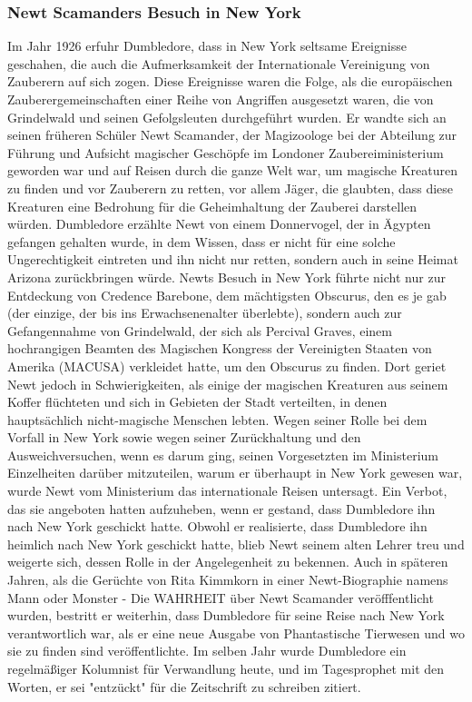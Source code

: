 \documentclass[a4paper, 10pt]{article}
\begin{document}
\subsubsection*{Newt Scamanders Besuch in New York}
Im Jahr 1926 erfuhr Dumbledore, dass in New York seltsame Ereignisse geschahen, die auch die Aufmerksamkeit der Internationale Vereinigung von Zauberern auf sich zogen. Diese Ereignisse waren die Folge, als die europäischen Zauberergemeinschaften einer Reihe von Angriffen ausgesetzt waren, die von Grindelwald und seinen Gefolgsleuten durchgeführt wurden.
\vspace{10pt}
\newline
{}  
Er wandte sich an seinen früheren Schüler Newt Scamander, der Magizoologe bei der Abteilung zur Führung und Aufsicht magischer Geschöpfe im Londoner Zaubereiministerium geworden war und auf Reisen durch die ganze Welt war, um magische Kreaturen zu finden und vor Zauberern zu retten, vor allem Jäger, die glaubten, dass diese Kreaturen eine Bedrohung für die Geheimhaltung der Zauberei darstellen würden. Dumbledore erzählte Newt von einem Donnervogel, der in Ägypten gefangen gehalten wurde, in dem Wissen, dass er nicht für eine solche Ungerechtigkeit eintreten und ihn nicht nur retten, sondern auch in seine Heimat Arizona zurückbringen würde. Newts Besuch in New York führte nicht nur zur Entdeckung von Credence Barebone, dem mächtigsten Obscurus, den es je gab (der einzige, der bis ins Erwachsenenalter überlebte), sondern auch zur Gefangennahme von Grindelwald, der sich als Percival Graves, einem hochrangigen Beamten des Magischen Kongress der Vereinigten Staaten von Amerika (MACUSA) verkleidet hatte, um den Obscurus zu finden. Dort geriet Newt jedoch in Schwierigkeiten, als einige der magischen Kreaturen aus seinem Koffer flüchteten und sich in Gebieten der Stadt verteilten, in denen hauptsächlich nicht-magische Menschen lebten.
\vspace{10pt}
\newline
{}  
Wegen seiner Rolle bei dem Vorfall in New York sowie wegen seiner Zurückhaltung und den Ausweichversuchen, wenn es darum ging, seinen Vorgesetzten im Ministerium Einzelheiten darüber mitzuteilen, warum er überhaupt in New York gewesen war, wurde Newt vom Ministerium das internationale Reisen untersagt. Ein Verbot, das sie angeboten hatten aufzuheben, wenn er gestand, dass Dumbledore ihn nach New York geschickt hatte. Obwohl er realisierte, dass Dumbledore ihn heimlich nach
New York geschickt hatte, blieb Newt seinem alten Lehrer treu und weigerte sich, dessen Rolle in der Angelegenheit zu bekennen. Auch in späteren Jahren, als die Gerüchte von Rita Kimmkorn in einer Newt-Biographie namens Mann oder Monster - Die WAHRHEIT über Newt Scamander veröfffentlicht wurden, bestritt er weiterhin, dass Dumbledore für seine Reise nach New York verantwortlich war, als er eine neue Ausgabe von Phantastische Tierwesen und wo sie zu finden sind veröffentlichte.
\vspace{10pt}
\newline
{}  
Im selben Jahr wurde Dumbledore ein regelmäßiger Kolumnist für Verwandlung heute, und im Tagesprophet mit den Worten, er sei "entzückt" für die Zeitschrift zu schreiben zitiert.
\end{document}
